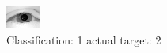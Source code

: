 \begin{figure}[h!]
\begin{center}
\includegraphics[width=0.60\columnwidth]{figures/ID2342_class_1_target_2.png}
\end{center}
\caption{ Classification: 1 actual target: 2}
\label{fig:ID2342_class_1_target_2}
\end{figure}
